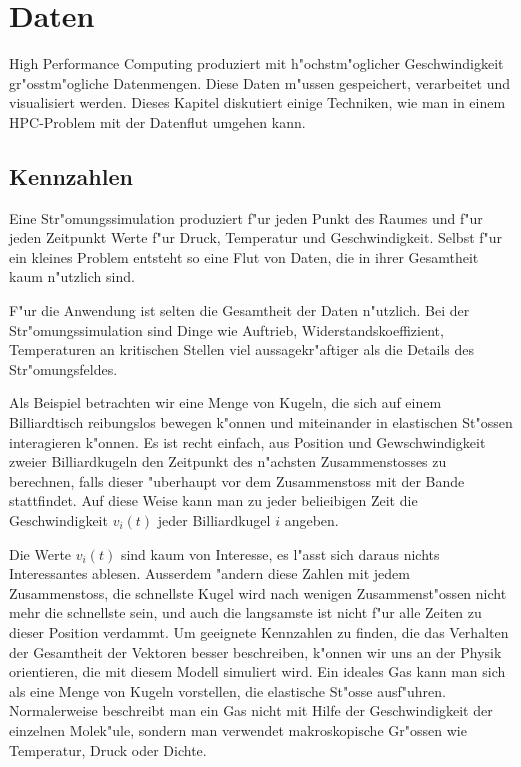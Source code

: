 \chapter{Daten}
High Performance Computing produziert mit h"ochstm"oglicher Geschwindigkeit
gr"osstm"ogliche Datenmengen. Diese Daten m"ussen gespeichert, verarbeitet
und visualisiert werden.
Dieses Kapitel diskutiert einige Techniken, wie man in einem HPC-Problem
mit der Datenflut umgehen kann.

\section{Kennzahlen}
Eine Str"omungssimulation produziert f"ur jeden Punkt des Raumes und
f"ur jeden Zeitpunkt Werte f"ur Druck, Temperatur und Geschwindigkeit.
Selbst f"ur ein kleines Problem entsteht so eine Flut von Daten, die
in ihrer Gesamtheit kaum n"utzlich sind. 

F"ur die Anwendung ist selten die Gesamtheit der Daten n"utzlich.
Bei der Str"omungssimulation sind Dinge wie Auftrieb, Widerstandskoeffizient,
Temperaturen an kritischen Stellen viel aussagekr"aftiger als die Details
des Str"omungsfeldes. 

Als Beispiel betrachten wir eine Menge von Kugeln, die sich auf einem
Billiardtisch reibungslos bewegen k"onnen und miteinander in elastischen
St"ossen interagieren k"onnen. Es ist recht einfach, aus Position und
Gewschwindigkeit zweier
Billiardkugeln den Zeitpunkt des n"achsten Zusammenstosses zu berechnen,
falls dieser "uberhaupt vor dem Zusammenstoss mit der Bande stattfindet.
Auf diese Weise kann man zu jeder belieibigen Zeit die Geschwindigkeit
$v_i(t)$ jeder Billiardkugel $i$ angeben.

Die Werte $v_i(t)$ sind kaum von Interesse, es l"asst sich daraus nichts
Interessantes ablesen.
Ausserdem "andern diese Zahlen mit jedem Zusammenstoss, die schnellste
Kugel wird nach wenigen Zusammenst"ossen nicht mehr die schnellste sein,
und auch die langsamste ist nicht f"ur alle Zeiten zu dieser Position
verdammt.
Um geeignete Kennzahlen zu finden, die das Verhalten der Gesamtheit
der Vektoren besser beschreiben, k"onnen wir uns an der Physik orientieren,
die mit diesem Modell simuliert wird.
Ein ideales Gas kann man sich als eine Menge von Kugeln vorstellen,
die elastische St"osse ausf"uhren.
Normalerweise beschreibt man ein Gas nicht mit Hilfe der Geschwindigkeit
der einzelnen Molek"ule, sondern man verwendet makroskopische Gr"ossen
wie Temperatur, Druck oder Dichte.

